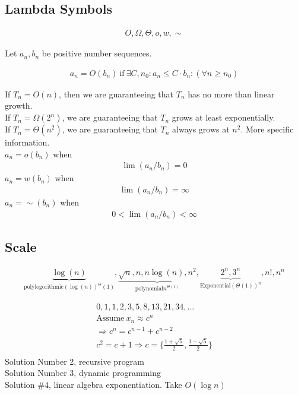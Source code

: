 \documentclass[class=scrartcl, crop=false]{standalone}
\begin{document}
\subsection{Lambda Symbols}

\begin{gather*}
  O, \Omega, \Theta, o, w, \sim
\end{gather*} 

Let $a_n, b_n$ be positive number sequences.

\begin{gather*}
  a_n = O(b_n) \ \text{if} \ \exists C, n_0 : a_n \leq C \cdot b_n : (\forall n \geq n_0)
\end{gather*} 

\begin{example}
  If $T_n = O(n)$, then we are guaranteeing that $T_n$ has no more than linear growth.
  \\
  If $T_n = \Omega(2^n)$, we are guaranteeing that $T_n$ grows at least exponentially.
  \\
  If  $T_n = \Theta(n^2)$, we are guaranteeing that $T_n$ always grows at $n^2$. More specific information.
  \\
  $a_n = o(b_n)$ when
  \begin{gather*}
    \lim(a_n / b_n) = 0
  \end{gather*} 
  \ii
  $a_n = w(b_n)$ when
  \begin{gather*}
    \lim(a_n / b_n) = \infty
  \end{gather*} 
  \ii
  $a_n = \sim(b_n)$ when
  \begin{gather*}
    0 < \lim(a_n / b_n) < \infty
  \end{gather*} 
\end{example} 

\subsection{Scale}

\begin{gather*}
  \underbrace{\log(n)}_{\text{polylogorithmic} (\log(n))^\Theta(1)}, \underbrace{\sqrt{n}, n, n\log(n), n^2}_{\text{polynomial} n^{\Theta(1)}}, \underbrace{2^n, 3^n}_{\text{Exponential} (\Theta(1))^n}, n!, n^n
\end{gather*} 

\begin{example}
  \begin{gather*}
    0, 1, 1, 2, 3, 5, 8, 13, 21, 34, \dots
    \\
    \text{Assume} \ x_n \approx c^n
    \\
    \Rightarrow c^n = c^{n - 1} + c^{n - 2} \\
    c^2 = c + 1 \Rightarrow c = \{\frac{1 + \sqrt{5}}{2}, \frac{1 - \sqrt{5}}{2}\} \\
  \end{gather*} 
  Solution Number 2, recursive program
  \\
  Solution Number 3, dynamic programming
  \\
  Solution \#4, linear algebra exponentiation. Take $O(\log n)$
\end{example} 
\end{document}

